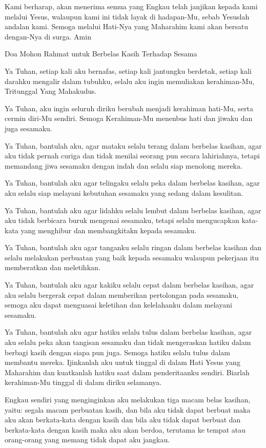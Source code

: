 \documentclass[a5paper,headsepline,titlepage,11pt,nnormalheadings,DIVcalc]{scrbook}
\begin{document}
Kami berharap, akan menerima semua yang Engkau telah janjikan kepada kami melalui Yesus, walaupun kami ini tidak layak di hadapan-Mu, sebab Yesuslah andalan kami. Semoga melalui Hati-Nya yang Maharahim kami akan bersatu dengan-Nya di surga. Amin

Doa Mohon Rahmat untuk Berbelas Kasih Terhadap Sesama

Ya Tuhan, setiap kali aku bernafas, setiap kali jantungku berdetak, setiap kali darahku mengalir dalam tubuhku, selalu aku ingin memuliakan kerahiman-Mu, Tritunggal Yang Mahakudus.

Ya Tuhan, aku ingin seluruh diriku berubah menjadi kerahiman hati-Mu, serta cermin diri-Mu sendiri. Semoga Kerahiman-Mu menenbus hati dan jiwaku dan juga sesamaku.

Ya Tuhan, bantulah aku, agar mataku selalu terang dalam berbelas kasihan, agar aku tidak pernah curiga dan tidak menilai seorang pun secara lahiriahnya, tetapi memandang jiwa sesamaku dengan indah dan selalu siap menolong mereka.

Ya Tuhan, bantulah aku agar telingaku selalu peka dalam berbelas kasihan, agar aku selalu siap melayani kebutuhan sesamaku yang sedang dalam kesulitan.

Ya Tuhan, bantulah aku agar lidahku selalu lembut dalam berbelas kasihan, agar aku tidak berbicara buruk mengenai sesamaku, tetapi selalu mengucapkan kata-kata yang menghibur dan membangkitakn kepada sesamaku.

Ya Tuhan, bantulah aku agar tanganku selalu ringan dalam berbelas kasihan dan selalu melakukan perbuatan yang baik kepada sesamaku walaupun pekerjaan itu memberatkan dan meletihkan.

Ya Tuhan, bantulah aku agar kakiku selalu cepat dalam berbelas kasihan, agar aku selalu bergerak cepat dalam memberikan pertolongan pada sesamaku, semoga aku dapat menguasai keletihan dan kelelahanku dalam melayani sesamaku.

Ya Tuhan, bantulah aku agar hatiku selalu tulus dalam berbelas kasihan, agar aku selalu peka akan tangisan sesamaku dan tidak mengeraskan hatiku dalam berbagi kasih dengan siapa pun juga. Semoga hatiku selalu tulus dalam membantu mereka. Ijinkanlah aku untuk tinggal di dalam Hati Yesus yang Maharahim dan kuatkanlah hatiku saat dalam penderitaanku sendiri. Biarlah kerahiman-Mu tinggal di dalam diriku selamanya.

Engkau sendiri yang menginginkan aku melakukan tiga macam belas kasihan, yaitu: segala macam perbuatan kasih, dan bila aku tidak dapat berbuat maka aku akan berkata-kata dengan kasih dan bila aku tidak dapat berbuat dan berkata-kata dengan kasih maka aku akan berdoa, terutama ke tempat atau orang-orang yang memang tidak dapat aku jangkau.
\end{document}
